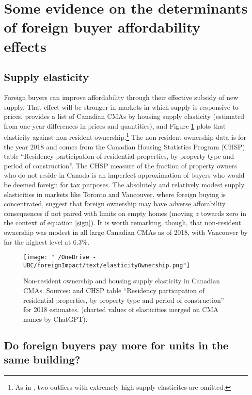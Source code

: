 \documentclass[12pt]{article}
\begin{document}
\section{Some evidence on the determinants of foreign buyer affordability effects}

\subsection{Supply elasticity}

Foreign buyers can improve affordability through their effective subsidy of new
supply. That effect will be stronger in markets in which supply is responsive
to prices. \textcite{paixao2021housing} provides a list of Canadian CMAs by
housing supply elasticity (estimated from one-year differences in prices and
quantities), and Figure \ref{fig:elasticityNonResident} plots that elasticity
against non-resident ownership.\footnote{As in \textcite{paixao202housing}, two
outliers with extremely high supply elasticites are omitted.} The non-resident
ownership data is for the year 2018 and comes from the Canadian Housing
Statistics Program (CHSP) table ``Residency participation of residential
properties, by property type and period of construction''.  The CHSP measure of
the fraction of property owners who do not reside in Canada is an imperfect
approximation of buyers who would be deemed foreign for tax purposes. The
absolutely and relatively modest supply elasticities in markets like Toronto
and Vancouver, where foreign buying is concentrated, suggest that foreign
ownership may have adverse afforability consequences if not paired with limits
on empty homes (moving $z$ towards zero in the context of equation
\eqref{sign}). It is worth remarking, though, that non-resident ownership was
modest in all large Canadian CMAs as of 2018, with Vancouver by far the highest
level at 6.3\%.

\begin{figure}
	\centering
	\texttt{[image: "~/OneDrive - UBC/foreignImpact/text/elasticityOwnership.png"]}
\caption{\label{fig:elasticityNonResident} Non-resident ownership and housing supply elasticity in Canadian CMAs. Sources: \textcite{paixao2021housing} and CHSP table ``Residency participation of residential properties, by property type and period of construction'' for 2018 estimates. (charted values of elasticities merged on CMA names by ChatGPT).}
\end{figure}

\subsection{Do foreign buyers pay more for units in the same building?}
\end{document}

